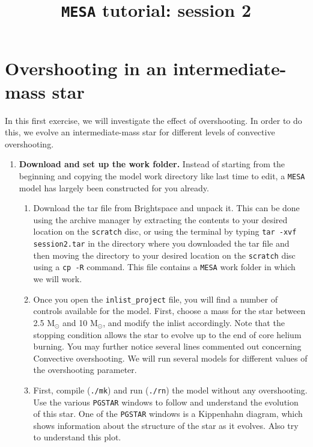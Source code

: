 \documentclass[11pt,a4paper]{article}
\begin{document}
\title{\textbf{\texttt{MESA} tutorial: session 2}}
\author{}
\date{}
\maketitle

\section{Overshooting in an intermediate-mass star}

In this first exercise, we will investigate the effect of overshooting. In order to do this, we evolve an intermediate-mass star for different levels of convective overshooting.


\begin{enumerate}

\item \textbf{Download and set up the work folder.} 
Instead of starting from the beginning and copying the model work directory like last time to edit, a \texttt{MESA} model has largely been constructed for you already. 


\begin{enumerate} 

    \item Download the tar file from Brightspace and unpack it. This can be done using the archive manager by extracting the contents to your desired location on the \texttt{scratch} disc, or using the terminal by typing \verb|tar -xvf session2.tar| in the directory where you downloaded the tar file and then moving the directory to your desired location on the \texttt{scratch} disc using a \texttt{cp -R} command. This file contains a \texttt{MESA} work folder in which we will work. 
    
    \item Once you open the \verb|inlist_project| file, you will find a number of controls available for the model. First, choose a mass for the star between 2.5 M$_\odot$ and 10 M$_\odot$, and modify the inlist accordingly. Note that the stopping condition allows the star to evolve up to the end of core helium burning. You may further notice several lines commented out concerning Convective overshooting. We will run several models for different values of the overshooting parameter. 

    \item First, compile (\verb|./mk|) and run (\verb|./rn|) the model without any overshooting. 
    Use the various \texttt{PGSTAR} windows to follow and understand the evolution of this star. One of the \texttt{PGSTAR} windows is a Kippenhahn diagram, which shows information about the structure of the star as it evolves. Also try to understand this plot.



\end{enumerate}
\end{enumerate}
\end{document}
